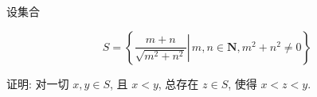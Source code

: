 \documentclass[aspectratio=169]{ctexbeamer}
\begin{document}

\begin{frame}
	设集合

	$$
		S=\left\{\left.\frac{m+n}{\sqrt{m^{2}+n^{2}}} \right\rvert\, m, n \in \mathbf{N}, m^{2}+n^{2} \neq 0\right\}
	$$

	证明: 对一切 $x, y \in S$, 且 $x<y$, 总存在 $z \in S$, 使得 $x<z<y$.
\end{frame}
\end{document}
